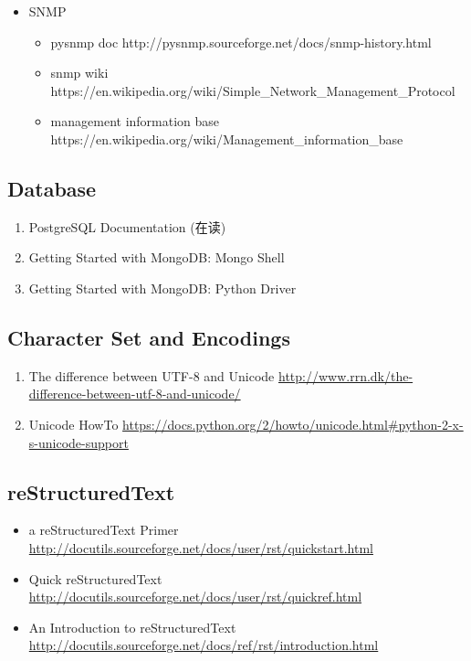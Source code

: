 \documentclass{article}
\begin{document}
\begin{enumerate}
        \begin{itemize}
            \item SNMP
                \begin{itemize}
                    \item pysnmp doc http://pysnmp.sourceforge.net/docs/snmp-history.html
                    \item snmp wiki https://en.wikipedia.org/wiki/Simple_Network_Management_Protocol
                    \item management information base https://en.wikipedia.org/wiki/Management_information_base
                \end{itemize}
        \end{itemize}
\end{enumerate}
\subsection{Database}
\begin{enumerate}
    \item PostgreSQL Documentation (在读)
    \item Getting Started with MongoDB: Mongo Shell
    \item Getting Started with MongoDB: Python Driver
\end{enumerate}
\subsection{Character Set and Encodings}
\begin{enumerate}
    \item The difference between UTF-8 and Unicode \url{http://www.rrn.dk/the-difference-between-utf-8-and-unicode/}
    \item Unicode HowTo \url{https://docs.python.org/2/howto/unicode.html#python-2-x-s-unicode-support}
\end{enumerate}
%
\subsection{reStructuredText}
\begin{itemize}
    \item a reStructuredText Primer \url{http://docutils.sourceforge.net/docs/user/rst/quickstart.html}
    \item Quick reStructuredText \url{http://docutils.sourceforge.net/docs/user/rst/quickref.html}
    \item An Introduction to reStructuredText \url{http://docutils.sourceforge.net/docs/ref/rst/introduction.html}
\end{itemize}
%
\end{document}
